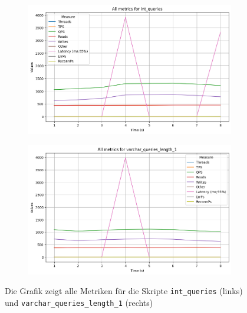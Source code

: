\begin{figure}[H]
    \centering
    \begin{subfigure}[t]{0.48\textwidth}
        \centering
        \includegraphics[width=\textwidth]{PNGs/Join_Type/int_queries}
        \label{join-typ-int_queries}
    \end{subfigure}
    \hfill
    \begin{subfigure}[t]{0.48\textwidth}
        \centering
        \includegraphics[width=\textwidth]{PNGs/Join_Type/varchar_queries_length_1}
        \label{join-typ-varchar_queries_length_1}
    \end{subfigure}
    \caption[Join-Typ: Skriptvergleich]{Die Grafik zeigt alle Metriken für die Skripte \texttt{int\_queries} (links) und \texttt{varchar\_queries\_length\_1} (rechts)}
    \label{fig:join-typ-comp-script}
\end{figure}
\vspace{-20pt}

